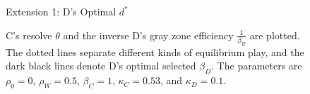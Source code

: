 \documentclass[
]{article}
\begin{document}
\begin{figure}
\vspace{0.8cm}

\caption{Extension 1: D's Optimal $d^{*}$}
\caption*{C's resolve $\theta$ and the inverse D's gray zone efficiency $\frac{1}{\beta_{D}}$ are plotted. The dotted lines separate different kinds of equilibrium play, and the dark black lines denote D's optimal selected $\beta_{D}$. The parameters are $\rho_{0}=0$, $\rho_{W}=0.5$, $\beta_{C}=1$, $\kappa_{C}=0.53$, and $\kappa_{D}=0.1$.}
\end{figure}
\end{document}
